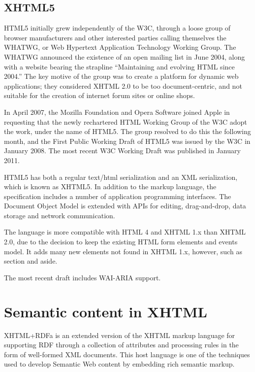 \section{XHTML5}


HTML5 initially grew independently of the W3C, through a loose group of browser manufacturers and other interested parties calling themselves the WHATWG, or Web Hypertext Application Technology Working Group. The WHATWG announced the existence of an open mailing list in June 2004, along with a website bearing the strapline “Maintaining and evolving HTML since 2004.” The key motive of the group was to create a platform for dynamic web applications; they considered XHTML 2.0 to be too document-centric, and not suitable for the creation of internet forum sites or online shops.

In April 2007, the Mozilla Foundation and Opera Software joined Apple in requesting that the newly rechartered HTML Working Group of the W3C adopt the work, under the name of HTML5. The group resolved to do this the following month, and the First Public Working Draft of HTML5 was issued by the W3C in January 2008. The most recent W3C Working Draft was published in January 2011.

HTML5 has both a regular text/html serialization and an XML serialization, which is known as XHTML5. In addition to the markup language, the specification includes a number of application programming interfaces. The Document Object Model is extended with APIs for editing, drag-and-drop, data storage and network communication.

The language is more compatible with HTML 4 and XHTML 1.x than XHTML 2.0, due to the decision to keep the existing HTML form elements and events model. It adds many new elements not found in XHTML 1.x, however, such as section and aside.


The most recent draft includes WAI-ARIA support.









\chapter{Semantic content in XHTML}

XHTML+RDFa is an extended version of the XHTML markup language for supporting RDF through a collection of attributes and processing rules in the form of well-formed XML documents. This host language is one of the techniques used to develop Semantic Web content by embedding rich semantic markup.



